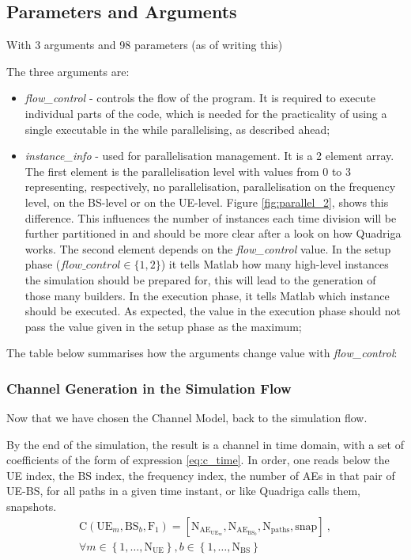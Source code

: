 \subsection{Parameters and Arguments}

With 3 arguments and 98 parameters (as of writing this)

The three arguments are:

\begin{itemize}
    \item \textit{flow\_control} - controls the flow of the program. It is required to execute individual parts of the code, which is needed for the practicality of using a single executable in the while parallelising, as described ahead;
    \item \textit{instance\_info} - used for parallelisation management. It is a 2 element array. The first element is the parallelisation level with values from 0 to 3 representing, respectively, no parallelisation, parallelisation on the frequency level, on the BS-level or on the UE-level. Figure \ref{fig:parallel_2}, shows this difference. This influences the number of instances each time division will be further partitioned in and should be more clear after a look on how Quadriga works. The second element depends on the \textit{flow\_control} value. In the setup phase ($flow\_control \in \{1, 2\}$) it tells Matlab how many high-level instances the simulation should be prepared for, this will lead to the generation of those many builders. In the execution phase, it tells Matlab which instance should be executed. As expected, the value in the execution phase should not pass the value given in the setup phase as the maximum;
\end{itemize}

The table below summarises how the arguments change value with \textit{flow\_control}:



\subsubsection*{Channel Generation in the Simulation Flow}

Now that we have chosen the Channel Model, back to the simulation flow.

By the end of the simulation, the result is a channel in time domain, with a set of coefficients of the form of expression \eqref{eq:c_time}. In order, one reads below the \acs{UE} index, the \acs{BS} index, the frequency index, the number of \acp{AE} in that pair of \acs{UE}-\acs{BS}, for all paths in a given time instant, or like Quadriga calls them, snapshots.
\begin{gather} \label{eq:c_time}
    \text{C}(\text{UE}_m, \text{BS}_b, \text{F}_1) = [\text{N}_{\text{AE}_{\text{UE}_m}}, \text{N}_{\text{AE}_{\text{BS}_b}}, \text{N}_\text{paths}, \text{snap}] \ , \\ 
    \forall m \in \left\{1, \dots, \text{N}_\text{UE}\right\}, b \in \left\{1, \dots, \text{N}_\text{BS}\right\} \nonumber
\end{gather}

